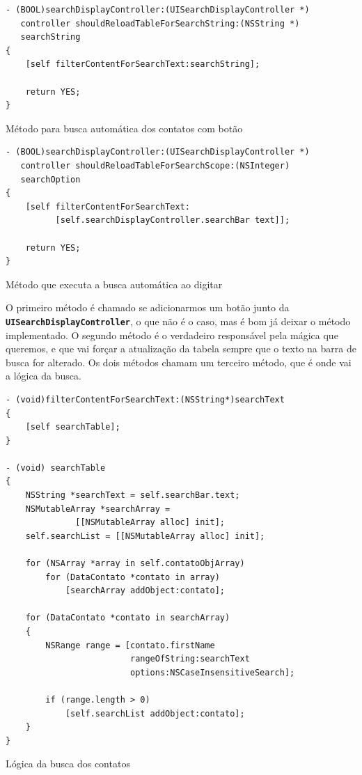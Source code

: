 \documentclass[a4paper,12pt,brazil,oneside]{book}
\begin{document}
\begin{listing}[H]
\begin{verbatim}
- (BOOL)searchDisplayController:(UISearchDisplayController *)
   controller shouldReloadTableForSearchString:(NSString *)
   searchString
{
    [self filterContentForSearchText:searchString];

    return YES;
}
\end{verbatim}
\caption{Método para busca automática dos contatos com botão}
\end{listing}

\begin{listing}[H]
\begin{verbatim}
- (BOOL)searchDisplayController:(UISearchDisplayController *)
   controller shouldReloadTableForSearchScope:(NSInteger)
   searchOption
{
    [self filterContentForSearchText:
          [self.searchDisplayController.searchBar text]];
    
    return YES;
}
\end{verbatim}
\caption{Método que executa a busca automática ao digitar}
\end{listing}

O primeiro método é chamado se adicionarmos um botão junto da\\
\texttt{\textbf{UISearchDisplayController}}, o que não é o caso, mas é bom já deixar o método implementado. O segundo método é o verdadeiro responsável pela mágica que queremos, e que vai forçar a atualização da tabela sempre que o texto na barra de busca for alterado. Os dois métodos chamam um terceiro método, que é onde vai a lógica da busca.

\begin{listing}[H]
\begin{verbatim}
- (void)filterContentForSearchText:(NSString*)searchText
{
    [self searchTable];
}

- (void) searchTable
{
    NSString *searchText = self.searchBar.text;
    NSMutableArray *searchArray =
              [[NSMutableArray alloc] init];
    self.searchList = [[NSMutableArray alloc] init];
    
    for (NSArray *array in self.contatoObjArray)
        for (DataContato *contato in array)
            [searchArray addObject:contato];
    
    for (DataContato *contato in searchArray)
    {
        NSRange range = [contato.firstName
                         rangeOfString:searchText
                         options:NSCaseInsensitiveSearch];
        
        if (range.length > 0)
            [self.searchList addObject:contato];
    }
}
\end{verbatim}
\caption{Lógica da busca dos contatos}
\end{listing}
\end{document}
